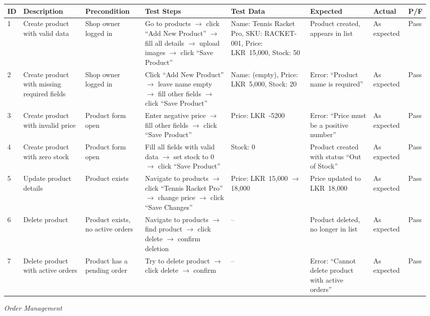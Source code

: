 \documentclass[12pt,a4paper]{report}
\begin{document}
\begin{center}
\footnotesize
\begin{longtable}{p{0.4cm} p{2.2cm} p{1.8cm} p{3.2cm} p{2.2cm} p{2.2cm} p{1.4cm} p{0.8cm}}
\toprule
\textbf{ID} & \textbf{Description} & \textbf{Precondition} & \textbf{Test Steps} & \textbf{Test Data} & \textbf{Expected} & \textbf{Actual} & \textbf{P/F}\\
\midrule
\endhead
1 & Create product with valid data & Shop owner logged in & Go to products $\to$ click ``Add New Product'' $\to$ fill all details $\to$ upload images $\to$ click ``Save Product'' & Name: Tennis Racket Pro, SKU: RACKET-001, Price: LKR~15,000, Stock: 50 & Product created, appears in list & As expected & Pass\\[4pt]
2 & Create product with missing required fields & Shop owner logged in & Click ``Add New Product'' $\to$ leave name empty $\to$ fill other fields $\to$ click ``Save Product'' & Name: (empty), Price: LKR~5,000, Stock: 20 & Error: ``Product name is required'' & As expected & Pass\\[4pt]
3 & Create product with invalid price & Product form open & Enter negative price $\to$ fill other fields $\to$ click ``Save Product'' & Price: LKR~-5200 & Error: ``Price must be a positive number'' & As expected & Pass\\[4pt]
4 & Create product with zero stock & Product form open & Fill all fields with valid data $\to$ set stock to 0 $\to$ click ``Save Product'' & Stock: 0 & Product created with status ``Out of Stock'' & As expected & Pass\\[4pt]
5 & Update product details & Product exists & Navigate to products $\to$ click ``Tennis Racket Pro'' $\to$ change price $\to$ click ``Save Changes'' & Price: LKR~15,000 $\to$ 18,000 & Price updated to LKR~18,000 & As expected & Pass\\[4pt]
6 & Delete product & Product exists, no active orders & Navigate to products $\to$ find product $\to$ click delete $\to$ confirm deletion & -- & Product deleted, no longer in list & As expected & Pass\\[4pt]
7 & Delete product with active orders & Product has a pending order & Try to delete product $\to$ click delete $\to$ confirm & -- & Error: ``Cannot delete product with active orders'' & As expected & Pass\\
\bottomrule
\end{longtable}
\end{center}

\textit{Order Management}
\end{document}
